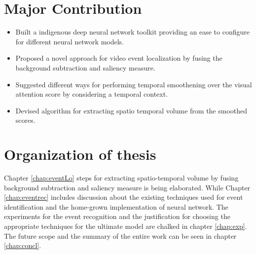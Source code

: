 \section{Major Contribution}
\begin{itemize}
	\item{Built a indigenous deep neural network toolkit providing an ease to configure for different neural network models.}
	\item{Proposed a novel approach for video event localization by fusing the background subtraction and saliency measure.}
	\item{Suggested different ways for performing temporal smoothening over the visual attention score by considering a temporal context.}
	\item{Devised algorithm for extracting spatio temporal volume from the smoothed scores.}
\end{itemize}

\section{Organization of thesis}
\par Chapter \ref{chap:eventLo} steps for extracting spatio-temporal volume by fusing background subtraction and saliency measure is being elaborated.  While Chapter \ref{chap:eventrec} includes discussion about the existing techniques used for event identification and the home-grown implementation of neural network.  The experiments for the event recognition and the justification for choosing the appropriate techniques for the ultimate model are chalked in chapter \ref{chap:exp}.  The future scope and the summary of the entire work can be seen in chapter \ref{chap:concl}.
